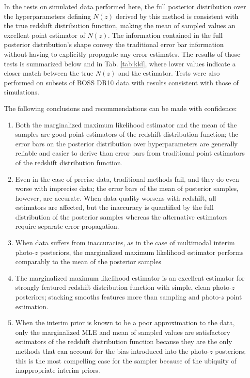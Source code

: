 In the tests on simulated data performed here, the full posterior distribution over the hyperparameters defining $N(z)$ derived by this method is consistent with the true redshift distribution function, making the mean of sampled values an excellent point estimator of $N(z)$.  
The information contained in the full posterior distribution's shape convey the traditional error bar information without having to explicitly propagate any error estimates.  
The results of those tests is summarized below and in Tab. \ref{tab:kld}, where lower values indicate a closer match between the true $N(z)$ and the estimator.  
Tests were also performed on subsets of BOSS DR10 data with results consistent with those of simulations.

The following conclusions and recommendations can be made with confidence:

\begin{enumerate}
	\item Both the marginalized maximum likelihood estimator and the mean of the samples are good point estimators of the redshift distribution function; the error bars on the posterior distribution over hyperparameters are generally reliable and easier to derive than error bars from traditional point estimators of the redshift distribution function.
	\item Even in the case of precise data, traditional methods fail, and they do even worse with imprecise data; the error bars of the mean of posterior samples, however, are accurate.  When data quality worsens with redshift, all estimators are affected, but the inaccuracy is quantified by the full distribution of the posterior samples whereas the alternative estimators require separate error propagation.  
	\item When data suffers from inaccuracies, as in the case of multimodal interim photo-$z$ posteriors, the marginalized maximum likelihood estimator performs comparably to the mean of the posterior samples
	\item The marginalized maximum likelihood estimator is an excellent estimator for strongly featured redshift distribution function with simple, clean photo-$z$ posteriors; stacking smooths features more than sampling and photo-$z$ point estimation.
	\item When the interim prior is known to be a poor approximation to the data, only the marginalized MLE and mean of sampled values are satisfactory estimators of the redshift distribution function because they are the only methods that can account for the bias introduced into the photo-$z$ posteriors; this is the most compelling case for the sampler because of the ubiquity of inappropriate interim priors.
\end{enumerate}

